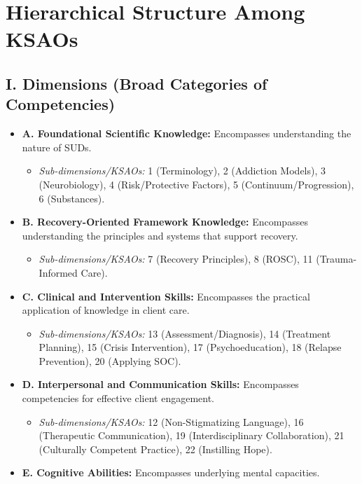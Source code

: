 \documentclass[
  letterpaper,
  DIV=11,
  numbers=noendperiod]{scrartcl}
\providecommand{\tightlist}{%
  \setlength{\itemsep}{0pt}\setlength{\parskip}{0pt}}
\begin{document}
\section{Hierarchical Structure Among
KSAOs}\label{hierarchical-structure-among-ksaos}

\subsection{I. Dimensions (Broad Categories of
Competencies)}\label{i.-dimensions-broad-categories-of-competencies}

\begin{itemize}
\tightlist
\item
  \textbf{A. Foundational Scientific Knowledge:} Encompasses
  understanding the nature of SUDs.

  \begin{itemize}
  \tightlist
  \item
    \emph{Sub-dimensions/KSAOs:} 1 (Terminology), 2 (Addiction Models),
    3 (Neurobiology), 4 (Risk/Protective Factors), 5
    (Continuum/Progression), 6 (Substances).
  \end{itemize}
\item
  \textbf{B. Recovery-Oriented Framework Knowledge:} Encompasses
  understanding the principles and systems that support recovery.

  \begin{itemize}
  \tightlist
  \item
    \emph{Sub-dimensions/KSAOs:} 7 (Recovery Principles), 8 (ROSC), 11
    (Trauma-Informed Care).
  \end{itemize}
\item
  \textbf{C. Clinical and Intervention Skills:} Encompasses the
  practical application of knowledge in client care.

  \begin{itemize}
  \tightlist
  \item
    \emph{Sub-dimensions/KSAOs:} 13 (Assessment/Diagnosis), 14
    (Treatment Planning), 15 (Crisis Intervention), 17
    (Psychoeducation), 18 (Relapse Prevention), 20 (Applying SOC).
  \end{itemize}
\item
  \textbf{D. Interpersonal and Communication Skills:} Encompasses
  competencies for effective client engagement.

  \begin{itemize}
  \tightlist
  \item
    \emph{Sub-dimensions/KSAOs:} 12 (Non-Stigmatizing Language), 16
    (Therapeutic Communication), 19 (Interdisciplinary Collaboration),
    21 (Culturally Competent Practice), 22 (Instilling Hope).
  \end{itemize}
\item
  \textbf{E. Cognitive Abilities:} Encompasses underlying mental
  capacities.


\end{itemize}
\end{document}
